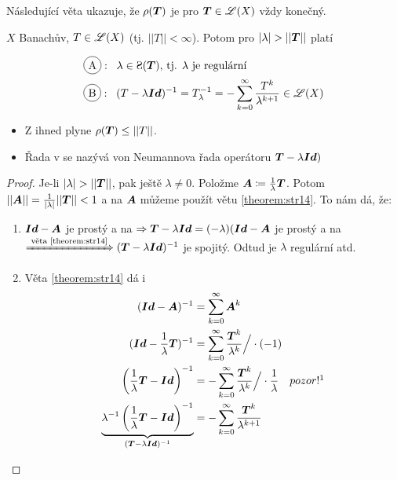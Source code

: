 Následující věta ukazuje, že $\rho(\boldsymbol{T})$ je pro $\boldsymbol{T} \in \mathscr{L}(X)$ vždy konečný.
\begin{theorem}
\label{theorem:str26}
    $X$ Banachův, $T\in \mathscr{L}(X)$ (tj. $||T||<\infty$). Potom pro $|\lambda|>||\map T||$ platí

\begin{align*}
        &\circled{A}:\;\; \lambda \in \Sp(\map T)\text{, tj. } \lambda \text{ je regulární}  \\
        &\circled{B}:\;\; (T-\lambda\map{Id})^{-1}=T_\lambda^{-1}=-\sum\limits_{k=0}^\infty\frac{T^k}{\lambda^{k+1}}\in\lin(X) 
\end{align*}
\end{theorem}

\begin{remark} 
\begin{itemize}
    \item Z  ihned plyne $\rho(\boldsymbol{T}) \leq ||T||$.
    \item Řada v  se nazývá von Neumannova řada operátoru $\boldsymbol{T}-\lambda \boldsymbol{Id})$
\end{itemize}
\end{remark}
\begin{proof}
    Je-li $|\lambda|>||\map T||$, pak ještě $\lambda\neq0$. Položme $\boldsymbol{A}\coloneqq\frac{1}{\lambda}\boldsymbol{T}$. Potom $||\boldsymbol{A}||=\frac{1}{|\lambda|}||\boldsymbol{T}||<1$ a na $\boldsymbol{A}$ můžeme použít větu \ref{theorem:str14}. To nám dá, že:
    \begin{enumerate}[label*=.]
        \item[\circled{A}] $\boldsymbol{Id}-\boldsymbol{A}$ je prostý a na $\Rightarrow \boldsymbol{T}-\lambda\boldsymbol{Id}=(-\lambda)(\boldsymbol{Id}-\boldsymbol{A}$ je prostý a na $\xRightarrow{\text{ věta \ref{theorem:str14}}} (\boldsymbol{T}-\lambda\boldsymbol{Id} )^{-1}$ je spojitý. Odtud je $\lambda$ regulární atd.
        \item[\circled{B}] Věta \ref{theorem:str14} dá i 
        \begin{align*}
            (\map{Id}-\map A)^{-1}&=\sum_{k=0}^\infty \map A^k\\
            (\map{Id}-\frac{1}{\lambda} \map T)^{-1}&=\sum_{k=0}^\infty\frac{\map T^k}{\lambda^k} \Big/ \cdot (-1)\\
            \left(\frac{1}{\lambda}\map T-\map{Id} \right)^{-1}&=-\sum_{k=0}^\infty\frac{\map T^k}{\lambda^k} \Big/\cdot \frac{1}{\lambda} \quad pozor!\footnotemark\\
            \underbrace{\lambda^{-1}\left(\frac{1}{\lambda}\map T-\map{Id} \right)^{-1}}_{(\map T-\lambda \map{Id})^{-1}}&=-\sum_{k=0}^\infty\frac{\map T^k}{\lambda^{k+1}}
        \end{align*}
      \end{enumerate}
\end{proof}


